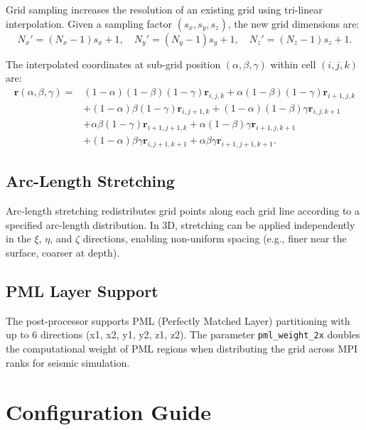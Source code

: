 \documentclass[11pt,a4paper]{report}
\newcommand{\rvec}{\bm{r}}
\begin{document}
Grid sampling increases the resolution of an existing grid using tri-linear interpolation. Given a sampling factor $(s_x, s_y, s_z)$, the new grid dimensions are:
\begin{equation}
    N_x' = (N_x - 1) s_x + 1, \quad N_y' = (N_y - 1) s_y + 1, \quad N_z' = (N_z - 1) s_z + 1.
\end{equation}

The interpolated coordinates at sub-grid position $(\alpha, \beta, \gamma)$ within cell $(i, j, k)$ are:
\begin{equation}
\begin{split}
    \rvec(\alpha, \beta, \gamma) = & (1-\alpha)(1-\beta)(1-\gamma) \rvec_{i,j,k} + \alpha(1-\beta)(1-\gamma) \rvec_{i+1,j,k} \\
    & + (1-\alpha)\beta(1-\gamma) \rvec_{i,j+1,k} + (1-\alpha)(1-\beta)\gamma \rvec_{i,j,k+1} \\
    & + \alpha\beta(1-\gamma) \rvec_{i+1,j+1,k} + \alpha(1-\beta)\gamma \rvec_{i+1,j,k+1} \\
    & + (1-\alpha)\beta\gamma \rvec_{i,j+1,k+1} + \alpha\beta\gamma \rvec_{i+1,j+1,k+1}.
\end{split}
\end{equation}

\section{Arc-Length Stretching}

Arc-length stretching redistributes grid points along each grid line according to a specified arc-length distribution. In 3D, stretching can be applied independently in the $\xi$, $\eta$, and $\zeta$ directions, enabling non-uniform spacing (e.g., finer near the surface, coarser at depth).

\section{PML Layer Support}

The post-processor supports PML (Perfectly Matched Layer) partitioning with up to 6 directions (x1, x2, y1, y2, z1, z2). The parameter \texttt{pml\_weight\_2x} doubles the computational weight of PML regions when distributing the grid across MPI ranks for seismic simulation.

\chapter{Configuration Guide}
\end{document}
